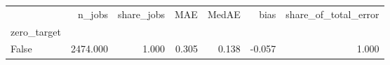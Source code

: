 \begin{tabular}{lrrrrrr}
\toprule
 & n_jobs & share_jobs & MAE & MedAE & bias & share_of_total_error \\
zero_target &  &  &  &  &  &  \\
\midrule
False & 2474.000 & 1.000 & 0.305 & 0.138 & -0.057 & 1.000 \\
\bottomrule
\end{tabular}

